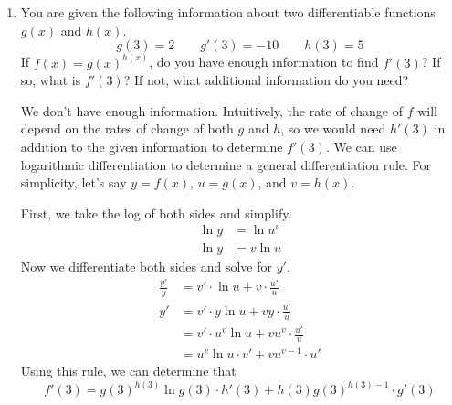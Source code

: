 \documentclass[main]{subfiles}
\begin{document}
\begin{enumerate}[resume]


\item
\begin{problem}[\stretch{1}]
    You are given the following information about two differentiable functions
    $g(x)$ and $h(x)$.
    \[  
    g(3)=2 \qquad g'(3)=-10 \qquad h(3)=5
    \]
    If $f(x)=g(x)^{h(x)}$, do you have enough information to find $f'(3)$?
    If so, what is $f'(3)$? If not, what additional information do you need?
\end{problem}

\begin{solution}
    We don't have enough information.
    Intuitively, the rate of change of $f$ will depend on the rates of change
    of both $g$ and $h$, so we would need $h'(3)$ in addition to the given
    information to determine $f'(3)$. We can use logarithmic differentiation
    to determine a general differentiation rule. For simplicity, let's say
    $y = f(x)$, $u = g(x)$, and $v = h(x)$.
    
    First, we take the log of both sides and simplify.
    \begin{align*}
    \ln y &= \ln u^v \\
    \ln y &= v \ln u
    \end{align*}
    Now we differentiate both sides and solve for $y'$.
    \begin{align*}
    \frac{y'}{y} &= v' \cdot \ln u + v \cdot \frac{u'}{u} \\
    y' &= v' \cdot y \ln u + v y \cdot \frac{u'}{u} \\
    &= v' \cdot u^v \ln u + v u^v \cdot \frac{u'}{u} \\
    &= u^v \ln u \cdot v' + v u^{v-1} \cdot u'
    \end{align*}
    Using this rule, we can determine that 
    \[f'(3) = g(3)^{h(3)}\ln g(3) \cdot h'(3)
    + h(3) g(3)^{h(3)-1} \cdot g'(3)\]
\end{solution}






\end{enumerate}
\end{document}
